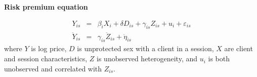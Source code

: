 \documentclass[notes=show]{beamer}
\begin{document}
\begin{frame}[plain]
\begin{center}
\textbf{Risk premium equation}
\end{center}

\begin{eqnarray*}
Y_{is} &=& \beta_i X_i + \delta{D_{is}} + \gamma_{is} Z_{is} + u_i + \varepsilon_{is} \\
\ddot{Y}_{is} &=& \gamma_{is} \ddot{Z}_{is} + \ddot \eta_{is}
\end{eqnarray*}where $Y$ is log price, $D$ is unprotected sex with a client in a session,  $X$ are client and session characteristics, $Z$ is unobserved heterogeneity, and $u_i$ is both unobserved and correlated with $Z_{is}$.  

\end{frame}
\end{document}
